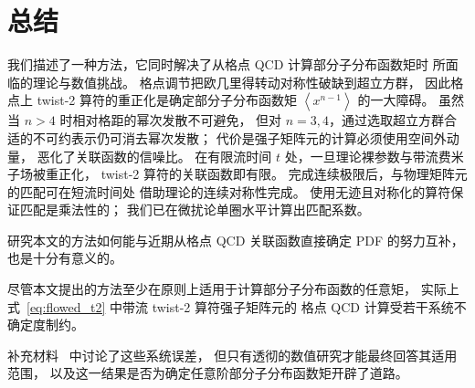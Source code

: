 \section{总结}
我们描述了一种方法，它同时解决了从格点 QCD 计算部分子分布函数矩时
所面临的理论与数值挑战。
格点调节把欧几里得转动对称性破缺到超立方群，
因此格点上 twist-2 算符的重正化是确定部分子分布函数矩
$\left\langle x^{n-1} \right\rangle$ 的一大障碍。
虽然当 $n>4$ 时相对格距的幂次发散不可避免，
但对 $n=3,4$，通过选取超立方群合适的不可约表示仍可消去幂次发散；
代价是强子矩阵元的计算必须使用空间外动量，
恶化了关联函数的信噪比。
在有限流时间 $t$ 处，一旦理论裸参数与带流费米子场被重正化，
twist-2 算符的关联函数即有限。
完成连续极限后，与物理矩阵元的匹配可在短流时间处
借助理论的连续对称性完成。
使用无迹且对称化的算符保证匹配是乘法性的；
我们已在微扰论单圈水平计算出匹配系数。

研究本文的方法如何能与近期从格点 QCD 关联函数直接确定 PDF 的努力互补，
也是十分有意义的。

尽管本文提出的方法至少在原则上适用于计算部分子分布函数的任意矩，
实际上式~\eqref{eq:flowed_t2} 中带流 twist-2 算符强子矩阵元的
格点 QCD 计算受若干系统不确定度制约。

补充材料~\cite{SupplMat} 中讨论了这些系统误差，
但只有透彻的数值研究才能最终回答其适用范围，
以及这一结果是否为确定任意阶部分子分布函数矩开辟了道路。
